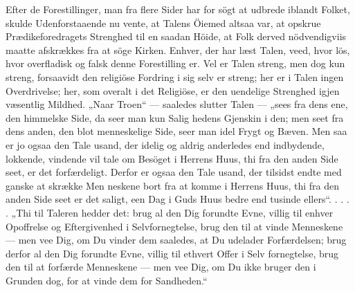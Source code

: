 \documentclass[12pt,a4paper]{article}
\newcommand{\opage}[1]{\marginnote{\footnotesize\textit{[#1]}}}
\begin{document}
Efter de Forestillinger, man fra flere Sider har for\-%
sögt at udbrede iblandt Folket, skulde Udenforstaaende
nu vente, at Talens Öiemed altsaa var, at opskrue
Prædikeforedragets Strenghed til en saadan Höide, at
Folk derved nödvendigviis maatte afskrækkes fra at
söge Kirken. Enhver, der har læst Talen, veed, hvor
lös, hvor overfladisk og falsk denne Forestilling er. Vel
er Talen streng, men dog kun streng, forsaavidt den
religiöse Fordring i sig selv er streng; her er i Talen
ingen Overdrivelse; her, som overalt i det Religiöse, er
den uendelige Strenghed igjen væsentlig Mildhed.
\opage{14} %
„Naar Troen“ --- saaledes slutter Talen --- „sees fra
dens ene, den himmelske Side, da seer man kun Salig\-%
hedens Gjenskin i den; men seet fra dens anden, den
blot menneskelige Side, seer man idel Frygt og Bæven.
Men saa er jo ogsaa den Tale usand, der idelig og
aldrig anderledes end indbydende, lokkende, vindende
vil tale om Besöget i Herrens Huus, thi fra den anden
Side seet, er det forfærdeligt. Derfor er ogsaa den Tale
usand, der tilsidst endte med ganske at skrække Men\-%
neskene bort fra at komme i Herrens Huus, thi fra den
anden Side seet er det saligt, een Dag i Guds Huus
bedre end tusinde ellers“. . . . . „Thi til Taleren hedder
det: brug al den Dig forundte Evne, villig til enhver
Opoffrelse og Eftergivenhed i Selvfornegtelse, brug den
til at vinde Menneskene --- men vee Dig, om Du vinder
dem saaledes, at Du udelader Forfærdelsen; brug derfor
al den Dig forundte Evne, villig til ethvert Offer i Selv\-%
fornegtelse, brug den til at forfærde Menneskene --- men
vee Dig, om Du ikke bruger den i Grunden dog, for at
vinde dem for Sandheden.“
\end{document}
